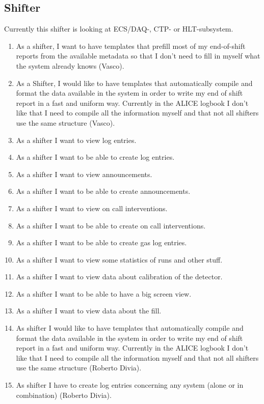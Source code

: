 \subsection{Shifter}
Currently this shifter is looking at ECS/DAQ-, CTP- or HLT-subsystem. 
\begin{enumerate}
  \item As a shifter, I want to have templates that prefill most of my end-of-shift reports from the available metadata so that I don’t need to fill in myself what the system already knows (Vasco).
  \item As a Shifter, I would like to have templates that automatically compile and format the data available in the system in order to write my end of shift report in a fast and uniform way. Currently in the ALICE logbook I don't like that I need to compile all the information myself and that not all shifters use the same structure (Vasco).
  \item As a shifter I want to view log entries.
  \item As a shifter I want to be able to create log entries.
  \item As a shifter I want to view announcements.
  \item As a shifter I want to be able to create announcements.
  \item As a shifter I want to view on call interventions.
  \item As a shifter I want to be able to create on call interventions.
  \item As a shifter I want to be able to create gas log entries.
  \item As a shifter I want to view some statistics of runs and other stuff.
  \item As a shifter I want to view data about calibration of the detector.
  \item As a shifter I want to be able to have a big screen view.
  \item As a shifter I want to view data about the fill.
  \item As shifter I would like to have templates that automatically compile  and format the data available in the system in order to write my end of shift report in a fast and uniform way. Currently in the ALICE logbook I don't like that I need to compile all the information myself and that not all shifters use the same structure (Roberto Divia).
  \item As shifter I have to create log entries concerning any system (alone or in combination) (Roberto Divia).

\end{enumerate}
